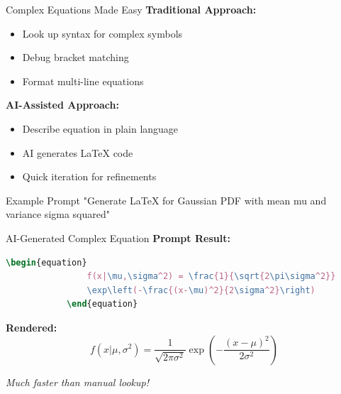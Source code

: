 \documentclass[aspectratio=169]{beamer}
\begin{document}
	\begin{frame}{Complex Equations Made Easy}
		\textbf{Traditional Approach:}
		\begin{itemize}
			\item Look up syntax for complex symbols
			\item Debug bracket matching
			\item Format multi-line equations
		\end{itemize}
		
		\vspace{0.5em}
		
		\textbf{AI-Assisted Approach:}
		\begin{itemize}
			\item Describe equation in plain language
			\item AI generates LaTeX code
			\item Quick iteration for refinements
		\end{itemize}
		
		\vspace{0.5em}
		
		\begin{block}{Example Prompt}
			"Generate LaTeX for Gaussian PDF with mean mu and variance sigma squared"
		\end{block}
	\end{frame}
	
	\begin{frame}[fragile]{AI-Generated Complex Equation}
		\textbf{Prompt Result:}
		\begin{lstlisting}[language=TeX,basicstyle=\ttfamily\footnotesize]
			\begin{equation}
				f(x|\mu,\sigma^2) = \frac{1}{\sqrt{2\pi\sigma^2}}
				\exp\left(-\frac{(x-\mu)^2}{2\sigma^2}\right)
			\end{equation}
		\end{lstlisting}
		
		\vspace{0.5em}
		
		\textbf{Rendered:}
		\begin{equation}
			f(x|\mu,\sigma^2) = \frac{1}{\sqrt{2\pi\sigma^2}}
			\exp\left(-\frac{(x-\mu)^2}{2\sigma^2}\right)
		\end{equation}
		
		\vspace{0.5em}
		
		\textit{Much faster than manual lookup!}
	\end{frame}
	
\end{document}
